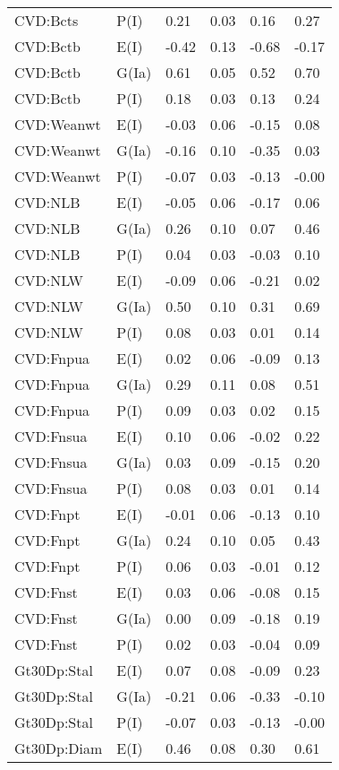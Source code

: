\begin{center}
\begin{longtable}{|p{1.1in}|p{0.7in}|p{0.7in}|p{0.6in}|p{0.6in}|p{0.6in}|}
  CVD:Bcts & P(I) & 0.21 & 0.03 & 0.16 & 0.27 \\ 
  CVD:Bctb & E(I) & -0.42 & 0.13 & -0.68 & -0.17 \\ 
  CVD:Bctb & G(Ia) & 0.61 & 0.05 & 0.52 & 0.70 \\ 
  CVD:Bctb & P(I) & 0.18 & 0.03 & 0.13 & 0.24 \\ 
  CVD:Weanwt & E(I) & -0.03 & 0.06 & -0.15 & 0.08 \\ 
  CVD:Weanwt & G(Ia) & -0.16 & 0.10 & -0.35 & 0.03 \\ 
  CVD:Weanwt & P(I) & -0.07 & 0.03 & -0.13 & -0.00 \\ 
  CVD:NLB & E(I) & -0.05 & 0.06 & -0.17 & 0.06 \\ 
  CVD:NLB & G(Ia) & 0.26 & 0.10 & 0.07 & 0.46 \\ 
  CVD:NLB & P(I) & 0.04 & 0.03 & -0.03 & 0.10 \\ 
  CVD:NLW & E(I) & -0.09 & 0.06 & -0.21 & 0.02 \\ 
  CVD:NLW & G(Ia) & 0.50 & 0.10 & 0.31 & 0.69 \\ 
  CVD:NLW & P(I) & 0.08 & 0.03 & 0.01 & 0.14 \\ 
  CVD:Fnpua & E(I) & 0.02 & 0.06 & -0.09 & 0.13 \\ 
  CVD:Fnpua & G(Ia) & 0.29 & 0.11 & 0.08 & 0.51 \\ 
  CVD:Fnpua & P(I) & 0.09 & 0.03 & 0.02 & 0.15 \\ 
  CVD:Fnsua & E(I) & 0.10 & 0.06 & -0.02 & 0.22 \\ 
  CVD:Fnsua & G(Ia) & 0.03 & 0.09 & -0.15 & 0.20 \\ 
  CVD:Fnsua & P(I) & 0.08 & 0.03 & 0.01 & 0.14 \\ 
  CVD:Fnpt & E(I) & -0.01 & 0.06 & -0.13 & 0.10 \\ 
  CVD:Fnpt & G(Ia) & 0.24 & 0.10 & 0.05 & 0.43 \\ 
  CVD:Fnpt & P(I) & 0.06 & 0.03 & -0.01 & 0.12 \\ 
  CVD:Fnst & E(I) & 0.03 & 0.06 & -0.08 & 0.15 \\ 
  CVD:Fnst & G(Ia) & 0.00 & 0.09 & -0.18 & 0.19 \\ 
  CVD:Fnst & P(I) & 0.02 & 0.03 & -0.04 & 0.09 \\ 
  Gt30Dp:Stal & E(I) & 0.07 & 0.08 & -0.09 & 0.23 \\ 
  Gt30Dp:Stal & G(Ia) & -0.21 & 0.06 & -0.33 & -0.10 \\ 
  Gt30Dp:Stal & P(I) & -0.07 & 0.03 & -0.13 & -0.00 \\ 
  Gt30Dp:Diam & E(I) & 0.46 & 0.08 & 0.30 & 0.61 \\ 

\end{longtable}
\end{center}
